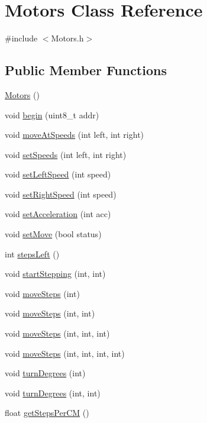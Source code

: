 \hypertarget{class_motors}{\section{Motors Class Reference}
\label{class_motors}
}


{\ttfamily \#include $<$Motors.\-h$>$}

\subsection*{Public Member Functions}
\begin{DoxyCompactItemize}
\item 
\hyperlink{class_motors_aef975cec60f33785886ce661226e7cfd}{Motors} ()
\item 
void \hyperlink{class_motors_a0dcf7acd7f2f0661b8a965b3565b5da5}{begin} (uint8\-\_\-t addr)
\item 
void \hyperlink{class_motors_add7dbb21bb40761547b70339e49b6c0c}{move\-At\-Speeds} (int left, int right)
\item 
void \hyperlink{class_motors_a2017e90a68d1125b4c830a298609d882}{set\-Speeds} (int left, int right)
\item 
void \hyperlink{class_motors_a177352e839ab155408f17a7b58bea35a}{set\-Left\-Speed} (int speed)
\item 
void \hyperlink{class_motors_a87f3fc3f7ea6d1e6a1105581e3ede7eb}{set\-Right\-Speed} (int speed)
\item 
void \hyperlink{class_motors_a9c9fdd51c844764d78dfeb4239824308}{set\-Acceleration} (int acc)
\item 
void \hyperlink{class_motors_af6c313e7a9902d0da0e7b737a4b6c60a}{set\-Move} (bool status)
\item 
int \hyperlink{class_motors_aa092596b27c58ecf3848b0cd14ca5d46}{steps\-Left} ()
\item 
void \hyperlink{class_motors_aa606cccc8cf4b5406b03fdb9885200b7}{start\-Stepping} (int, int)
\item 
void \hyperlink{class_motors_ae54c7865650a7f34327aaa954cbfe436}{move\-Steps} (int)
\item 
void \hyperlink{class_motors_ade2ea4fcade07f0f7691bfafec445f36}{move\-Steps} (int, int)
\item 
void \hyperlink{class_motors_aa10044c63b6a3e396c4d6170d5fde6a6}{move\-Steps} (int, int, int)
\item 
void \hyperlink{class_motors_a9a5ec290a3e233d022b343feab1707e6}{move\-Steps} (int, int, int, int)
\item 
void \hyperlink{class_motors_aa094015e8ea1e028567920eeadee3542}{turn\-Degrees} (int)
\item 
void \hyperlink{class_motors_a179485eb76f61384742dcf16805b4eb4}{turn\-Degrees} (int, int)
\item 
float \hyperlink{class_motors_ab5330f3f866ae5a5439c7df7c1594e1d}{get\-Steps\-Per\-C\-M} ()
\end{DoxyCompactItemize}


